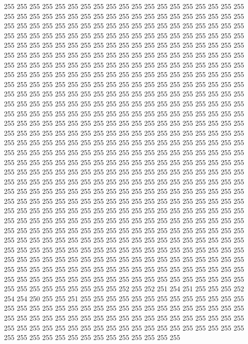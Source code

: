 255 255 255 255 255 255 255 255 255 255 255 255 255 255 255 255 255 255 255 255
255 255 255 255 255 255 255 255 255 255 255 255 255 255 255 255 255 255 255 255
255 255 255 255 255 255 255 255 255 255 255 255 255 255 255 255 255 255 255 255
255 255 255 255 255 255 255 255 255 255 255 255 255 255 255 255 255 255 255 255
255 255 255 255 255 255 255 255 255 255 255 255 255 255 255 255 255 255 255 255
255 255 255 255 255 255 255 255 255 255 255 255 255 255 255 255 255 255 255 255
255 255 255 255 255 255 255 255 255 255 255 255 255 255 255 255 255 255 255 255
255 255 255 255 255 255 255 255 255 255 255 255 255 255 255 255 255 255 255 255
255 255 255 255 255 255 255 255 255 255 255 255 255 255 255 255 255 255 255 255
255 255 255 255 255 255 255 255 255 255 255 255 255 255 255 255 255 255 255 255
255 255 255 255 255 255 255 255 255 255 255 255 255 255 255 255 255 255 255 255
255 255 255 255 255 255 255 255 255 255 255 255 255 255 255 255 255 255 255 255
255 255 255 255 255 255 255 255 255 255 255 255 255 255 255 255 255 255 255 255
255 255 255 255 255 255 255 255 255 255 255 255 255 255 255 255 255 255 255 255
255 255 255 255 255 255 255 255 255 255 255 255 255 255 255 255 255 255 255 255
255 255 255 255 255 255 255 255 255 255 255 255 255 255 255 255 255 255 255 255
255 255 255 255 255 255 255 255 255 255 255 255 255 255 255 255 255 255 255 255
255 255 255 255 255 255 255 255 255 255 255 255 255 255 255 255 255 255 255 255
255 255 255 255 255 255 255 255 255 255 255 255 255 255 255 255 255 255 255 255
255 255 255 255 255 255 255 255 255 255 255 255 255 255 255 255 255 255 255 255
255 255 255 255 255 255 255 255 255 255 255 255 255 255 255 255 255 255 255 255
255 255 255 255 255 255 255 255 255 255 255 255 255 255 255 255 255 255 255 255
255 255 255 255 255 255 255 255 255 255 255 255 255 255 255 255 255 255 255 255
255 255 255 255 255 255 255 255 255 255 255 255 255 255 255 255 255 255 255 255
255 255 255 255 255 255 255 255 255 255 255 255 255 255 255 255 255 255 255 255
255 255 255 255 255 255 255 255 255 255 255 255 255 255 255 255 255 255 255 255
255 255 255 255 255 255 255 255 255 255 255 255 255 255 255 255 255 255 255 255
255 255 255 255 255 255 255 255 255 255 255 255 255 255 255 255 255 255 255 255
252 255 252 251 254 251 255 255 255 252 254 254 250 255 255 251 255 255 255 255
255 255 255 255 255 255 255 255 255 255 255 255 255 255 255 255 255 255 255 255
255 255 255 255 255 255 255 255 255 255 255 255 255 255 255 255 255 255 255 255
255 255 255 255 255 255 255 255 255 255 255 255 255 255 255 255 255 255 255 255
255 255 255 255 255 255 255 255 255 255 255 255 255 255 255 255 255 255 255 255
